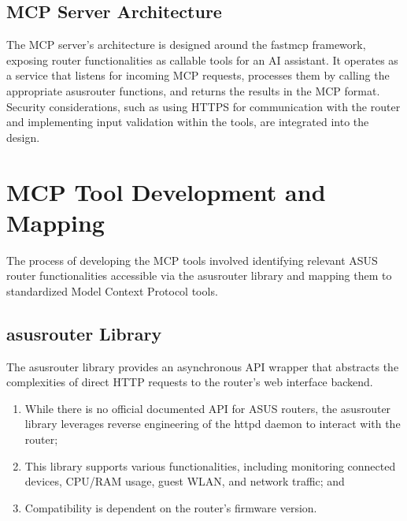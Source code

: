 \subsection{MCP Server Architecture}
The MCP server's architecture is designed around the fastmcp framework, exposing router functionalities as callable tools for an AI assistant. It operates as a service that listens for incoming MCP requests, processes them by calling the appropriate asusrouter functions, and returns the results in the MCP format. Security considerations, such as using HTTPS for communication with the router and implementing input validation within the tools, are integrated into the design.
\section{MCP Tool Development and Mapping}
The process of developing the MCP tools involved identifying relevant ASUS router functionalities accessible via the asusrouter library and mapping them to standardized Model Context Protocol tools.
\subsection{asusrouter Library}
The asusrouter library provides an asynchronous API wrapper that abstracts the complexities of direct HTTP requests to the router's web interface backend.
\begin{enumerate}
\item While there is no official documented API for ASUS routers, the asusrouter library leverages reverse engineering of the httpd daemon to interact with the router;
\item This library supports various functionalities, including monitoring connected devices, CPU/RAM usage, guest WLAN, and network traffic; and
\item Compatibility is dependent on the router's firmware version.
\end{enumerate}
